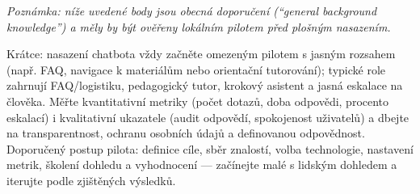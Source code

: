 \noindent\textit{Poznámka: níže uvedené body jsou obecná doporučení (``general background knowledge'') a měly by být ověřeny lokálním pilotem před plošným nasazením.}\medskip

Krátce: nasazení chatbota vždy začněte omezeným pilotem s jasným rozsahem (např. FAQ, navigace k materiálům nebo orientační tutorování); typické role zahrnují FAQ/logistiku, pedagogický tutor, krokový asistent a jasná eskalace na člověka. Měřte kvantitativní metriky (počet dotazů, doba odpovědi, procento eskalací) i kvalitativní ukazatele (audit odpovědí, spokojenost uživatelů) a dbejte na transparentnost, ochranu osobních údajů a definovanou odpovědnost. Doporučený postup pilota: definice cíle, sběr znalostí, volba technologie, nastavení metrik, školení dohledu a vyhodnocení — začínejte malé s lidským dohledem a iterujte podle zjištěných výsledků.